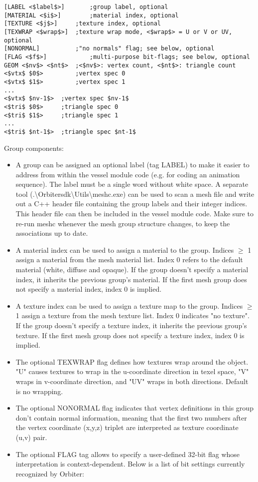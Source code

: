 \documentclass[Orbiter Developer Manual.tex]{subfiles}
\begin{document}
\begin{lstlisting}[language=OSFS,mathescape=true]
[LABEL <$label$>]		;group label, optional
[MATERIAL <$i$>]		;material index, optional
[TEXTURE <$j$>]		;texture index, optional
[TEXWRAP <$wrap$>]	;texture wrap mode, <$wrap$> = U or V or UV, optional
[NONORMAL]			;"no normals" flag; see below, optional
[FLAG <$f$>]			;multi-purpose bit-flags; see below, optional
GEOM <$nv$> <$nt$>	;<$nv$>: vertex count, <$nt$>: triangle count
<$vtx$ $0$>			;vertex spec 0
<$vtx$ $1$>			;vertex spec 1
...
<$vtx$ $nv-1$>	;vertex spec $nv-1$
<$tri$ $0$>		;triangle spec 0
<$tri$ $1$>		;triangle spec 1
...
<$tri$ $nt-1$>	;triangle spec $nt-1$
\end{lstlisting}

\noindent
Group components:

\begin{itemize}
\item A group can be assigned an optional label (tag LABEL) to make it easier to address from within the vessel module code (e.g. for coding an animation sequence). The label must be a single word without white space. A separate tool (.\textbackslash Orbitersdk\textbackslash Utils\textbackslash meshc.exe) can be used to scan a mesh file and write out a C++ header file containing the group labels and their integer indices. This header file can then be included in the vessel module code. Make sure to re-run meshc whenever the mesh group structure changes, to keep the associations up to date.
\item A material index can be used to assign a material to the group. Indices $\geq$ 1 assign a material from the mesh material list. Index 0 refers to the default material (white, diffuse and opaque). If the group doesn’t specify a material index, it inherits the previous group’s material. If the first mesh group does not specify a material index, index 0 is implied.
\item A texture index can be used to assign a texture map to the group. Indices $\geq$ 1 assign a texture from the mesh texture list. Index 0 indicates "no texture". If the group doesn’t specify a texture index, it inherits the previous group’s texture. If the first mesh group does not specify a texture index, index 0 is implied.
\item The optional TEXWRAP flag defines how textures wrap around the object. "U" causes textures to wrap in the u-coordinate direction in texel space, "V" wraps in v-coordinate direction, and "UV" wraps in both directions. Default is no wrapping.
\item The optional NONORMAL flag indicates that vertex definitions in this group don’t contain normal information, meaning that the first two numbers after the vertex coordinate (x,y,z) triplet are interpreted as texture coordinate (u,v) pair.
\item The optional FLAG tag allows to specify a user-defined 32-bit flag whose interpretation is context-dependent. Below is a list of bit settings currently recognized by Orbiter:


\end{itemize}
\end{document}
